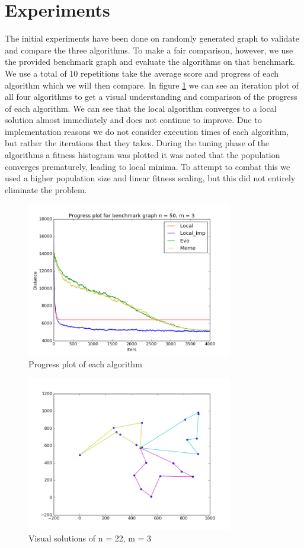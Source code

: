 \documentclass[journal]{IEEEtrancz}
\begin{document}
\section{Experiments}
The initial experiments have been done on randomly generated graph to validate and compare the three algorithms.
To make a fair comparison, however, we use the provided benchmark graph and evaluate the algorithms on that benchmark. We use a total of 10 repetitions take the average score and progress of each algorithm which we will then compare. In figure \ref{fig:progfig} we can see an iteration plot of all four algorithms to get 
a visual understanding and comparison of the progress of each algorithm. We can see that the local algorithm
converges to a local solution almost immediately and does not continue to improve. Due to implementation reasons we do not consider execution times of each algorithm, but rather the iterations that they takes. 
During the tuning phase of the algorithms a fitness histogram was plotted it was noted that the population converges prematurely, leading to local minima. To attempt to combat this we used a higher population size and linear fitness scaling, but this did not entirely eliminate the problem.


\begin{figure}[ht]
  \centering
    \includegraphics[width=9cm]{progplot}
      \caption{Progress plot of each algorithm}
    \label{fig:progfig}
\end{figure}

\begin{figure}[ht]
  \centering
    \includegraphics[width=9cm]{clean}
      \caption{Visual solutions of n = 22, m = 3}
    \label{fig:solfig}
\end{figure}
\end{document}
